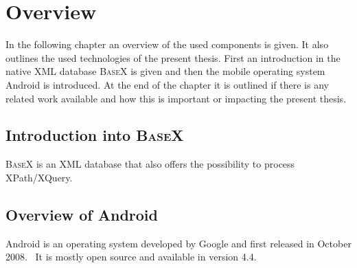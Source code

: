 \chapter{Overview}
\label{cha:overview}
In the following chapter an overview of the used components is given.
It also outlines the used technologies of the present thesis.
First an introduction in the native XML database \textsc{BaseX} is given and then the mobile operating system Android is introduced.
At the end of the chapter it is outlined if there is any related work available and how this is important or impacting the present thesis.


%

\section{Introduction into \textsc{BaseX}}
\label{sec:overview:introduction-into-basex}
\textsc{BaseX} is an XML database that also offers the possibility to process XPath/XQuery.

\section{Overview of Android}
\label{sec:overview:overview-of-android}
Android is an operating system developed by Google and first released in October 2008.~\cite{developers2011android}
It is mostly open source and available in version 4.4.


